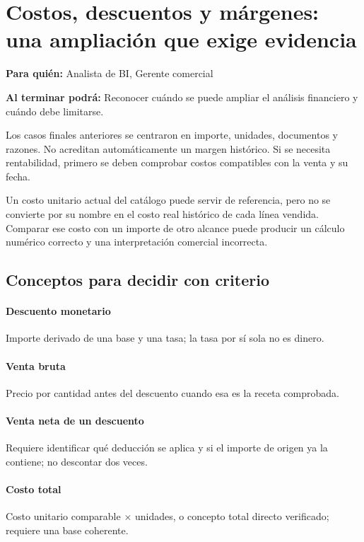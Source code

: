 \section{Costos, descuentos y márgenes: una ampliación que exige evidencia}
\label{unidad:BI08}
\textbf{Para quién:} Analista de BI, Gerente comercial\par
\textbf{Al terminar podrá:} Reconocer cuándo se puede ampliar el análisis financiero y cuándo debe limitarse.

Los casos finales anteriores se centraron en importe, unidades, documentos y razones. No acreditan automáticamente un margen histórico. Si se necesita rentabilidad, primero se deben comprobar costos compatibles con la venta y su fecha.

Un costo unitario actual del catálogo puede servir de referencia, pero no se convierte por su nombre en el costo real histórico de cada línea vendida. Comparar ese costo con un importe de otro alcance puede producir un cálculo numérico correcto y una interpretación comercial incorrecta.

\subsection{Conceptos para decidir con criterio}
\paragraph{Descuento monetario} Importe derivado de una base y una tasa; la tasa por sí sola no es dinero.

\paragraph{Venta bruta} Precio por cantidad antes del descuento cuando esa es la receta comprobada.

\paragraph{Venta neta de un descuento} Requiere identificar qué deducción se aplica y si el importe de origen ya la contiene; no descontar dos veces.

\paragraph{Costo total} Costo unitario comparable \(\times\) unidades, o concepto total directo verificado; requiere una base coherente.

